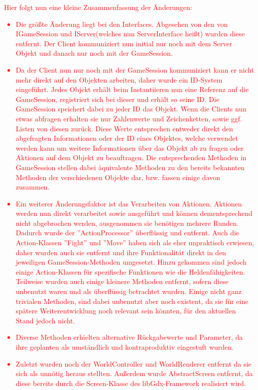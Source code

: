 \documentclass[fontsize=12pt,paper=a4,twoside]{scrartcl}
\begin{document}
\textcolor{red}{Hier folgt nun eine kleine Zusammenfassung der Änderungen:
\begin{itemize}
\item Die größte Änderung liegt bei den Interfaces. Abgesehen von den von IGameSession und IServer(welches nun ServerInterface heißt) wurden diese entfernt. Der Client kommuniziert nun initial nur noch mit dem Server Objekt und danach nur noch mit der GameSession.
\item Da der Client nun nur noch mit der GameSession kommuniziert kann er nicht mehr direkt auf den Objekten arbeiten, daher wurde ein ID-System eingeführt. Jedes Objekt erhält beim Instantiieren nun eine Referenz auf die GameSession, registriert sich bei dieser und erhält so seine ID. Die GameSession speichert dabei zu jeder ID das Objekt. Wenn die Clients nun etwas abfragen erhalten sie nur Zahlenwerte und Zeichenketten, sowie ggf. Listen von diesen zurück. Diese Werte entsprechen entweder direkt den abgefragten Informationen oder der ID eines Objektes, welche verwendet werden kann um weitere Informationen über das Objekt ab zu fragen oder Aktionen auf dem Objekt zu beauftragen. Die entsprechenden Methoden in GameSession stellen dabei äquivalente Methoden zu den bereits bekannten Methoden der verschiedenen Objekte dar, bzw. fassen einige davon zusammen.
\item Ein weiterer Änderungsfaktor ist das Verarbeiten von Aktionen. Aktionen werden nun direkt verarbeitet sowie ausgeführt und können dementsprechend nicht abgebrochen werden, ausgenommen sie benötigen mehrere Runden. Dadurch wurde der ''ActionProcessor'' überflüssig und entfernt. Auch die Action-Klassen ''Fight'' und ''Move'' haben sich als eher unpraktisch erwiesen, daher wurden auch sie entfernt und ihre Funktionalität direkt in den jeweiligen GameSession-Methoden umgesetzt. Hinzu gekommen sind jedoch einige Action-Klassen für spezifische Funktionen wie die Heldenfähigkeiten. Teilweise wurden auch einige kleinere Methoden entfernt, sofern diese unbenutzt waren und als überflüssig betrachtet wurden. Einige nicht ganz trivialen Methoden, sind dabei unbenutzt aber noch existent, da sie für eine spätere Weiterentwicklung noch relevant sein könnten, für den aktuellen Stand jedoch nicht. 
\item Diverse Methoden erhielten alternative Rückgabewerte und Parameter, da ihre geplanten als umständlich und kontraproduktiv eingestuft wurden.
\item Zuletzt wurden noch der WorldController und WorldRenderer entfernt da sie sich als unnötig heraus stellten. Außerdem wurde AbstractScreen entfernt, da diese bereits durch die Screen-Klasse des libGdx-Framework realisiert wird.
\end{itemize} }
\end{document}
